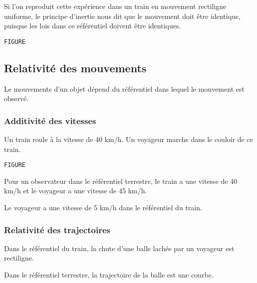 Si l'on reproduit cette expérience dans un train en mouvement rectiligne uniforme, le principe d'inertie nous dit que le mouvement doit être identique, puisque les lois dans ce référentiel doivent être identiques.

\begin{center}
%
\texttt{FIGURE}
\end{center}

  \subsection{Relativité des mouvements}

Le mouvements d'un objet dépend du référentiel dans lequel le mouvement est observé.

    \subsubsection{Additivité des vitesses}

Un train roule à la vitesse de 40 km/h. Un voyageur marche dans le couloir de ce train.


\begin{center}
%
\texttt{FIGURE}
\end{center}


Pour un observateur dans le référentiel terrestre, le train a une vitesse de 40 km/h et le voyageur a une vitesse de 45 km/h. 

Le voyageur a une vitesse de 5 km/h dans le référentiel du train.

    \subsubsection{Relativité des trajectoires}

Dans le référentiel du train, la chute d'une balle lachée par un voyageur est rectiligne.

Dans le référentiel terrestre, la trajectoire de la balle est une courbe.





